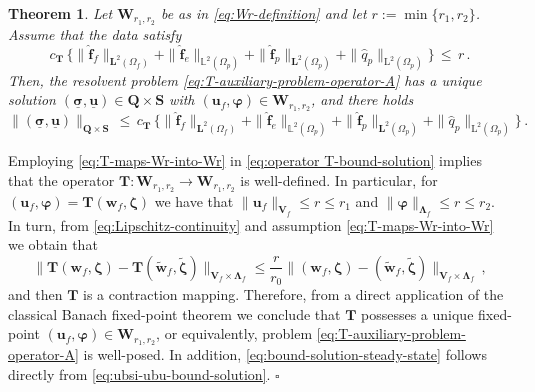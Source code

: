 \documentclass[11pt]{article}
\numberwithin{equation}{section}
\newcommand{\bLambda}{{\boldsymbol\Lambda}}
\newcommand{\bsi}{{\boldsymbol\sigma}}
\newcommand{\bvarphi}{{\boldsymbol\varphi}}
\newcommand{\bzeta}{{\boldsymbol\zeta}}
\newcommand{\ubsi}{\underline{\bsi}}
\newcommand{\ubu}{\underline{\bu}}
\newcommand{\bw}{{\mathbf{w}}}
\newcommand{\f}{\mathbf{f}}
\newcommand{\bu}{\mathbf{u}}
\newcommand{\0}{{\mathbf{0}}}
\def\bV{\mathbf{V}}
\def\bW{\mathbf{W}}
\def\bT{\mathbf{T}}
\def\bQ{\mathbf{Q}}
\def\bS{\mathbf{S}}
\newcommand{\bL}{\mathbf{L}}
\newcommand\bbL{\mathbb{L}}
\def\L{\mathrm{L}}
\def\wt{\widetilde}
\def\wh{\widehat}
\newtheorem{thm}{Theorem}[section]
\newenvironment{proof}{\noindent{\it Proof.}}{\hfill$\square$}
\numberwithin{equation}{section}
\begin{document}
\begin{thm}\label{thm:well-posed-domain-D}
Let $\bW_{r_1,r_2}$ be as in \eqref{eq:Wr-definition} and let $r:=\min\big\{r_1, r_2\big\}$. 
Assume that the data satisfy
%
\begin{equation}\label{eq:T-maps-Wr-into-Wr}
{c_\bT\,\Big\{ \|\wh{\f}_f\|_{\bL^2(\Omega_f)} +  \|\wh{\f}_e\|_{\bbL^2(\Omega_p)}+ \|\wh{\f}_p\|_{\bL^2(\Omega_p)} + \| \wh{q}_p\|_{\L^2(\Omega_p)} \Big\}} 
\,\leq\, r\,.
\end{equation}	
Then, the resolvent problem \eqref{eq:T-auxiliary-problem-operator-A} has a unique solution $(\ubsi,\ubu)\in \bQ\times \bS$ with $(\bu_f,\bvarphi)\in \bW_{r_1,r_2}$, and there holds
\begin{equation}\label{eq:bound-solution-steady-state}
\|(\ubsi,\ubu)\|_{\bQ\times \bS} 
\,\leq\, c_\bT\,\Big\{ \|\wh{\f}_f\|_{\bL^2(\Omega_f)} +  \|\wh{\f}_e\|_{\bbL^2(\Omega_p)}+ \|\wh{\f}_p\|_{\bL^2(\Omega_p)} + \|\wh{q}_p\|_{\L^2(\Omega_p)} \Big\} \,.
\end{equation} 
\end{thm}
%
\begin{proof}
Employing \eqref{eq:T-maps-Wr-into-Wr} in \eqref{eq:operator T-bound-solution} implies that the operator $\bT:\bW_{r_1,r_2}\to \bW_{r_1,r_2}$ is well-defined. In particular, for $(\bu_f,\bvarphi) = \bT(\bw_f,\bzeta)$ we have that
$\|\bu_f\|_{\bV_f} \leq r \leq r_1$ and $\|\bvarphi\|_{\bLambda_f} \leq r \leq r_2$.
In turn, from \eqref{eq:Lipschitz-continuity} and assumption \eqref{eq:T-maps-Wr-into-Wr} we obtain that
\begin{equation*}%
\|\bT(\bw_f,\bzeta) - \bT(\wt{\bw}_f,\wt{\bzeta}) \|_{\bV_f\times \bLambda_f}  \leq \frac{r}{r_0}\|(\bw_f,\bzeta) - (\wt{\bw}_f,\wt{\bzeta})\|_{\bV_f\times \bLambda_f}\,,
\end{equation*}
and then $\bT$ is a contraction mapping.
Therefore, from a direct application of the classical Banach fixed-point theorem we conclude that $\bT$ possesses a unique fixed-point $(\bu_f,\bvarphi)\in \bW_{r_1,r_2}$, or equivalently, problem \eqref{eq:T-auxiliary-problem-operator-A} is well-posed. In addition, \eqref{eq:bound-solution-steady-state} follows directly from \eqref{eq:ubsi-ubu-bound-solution}.
\end{proof}

\end{document}
